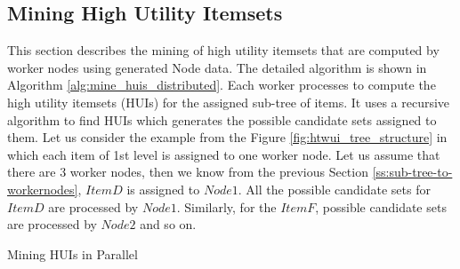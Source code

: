 \documentclass[11pt,openright]{report}
\begin{document}
\subsection{Mining High Utility Itemsets} \label{ss:minehuis}
This section describes the mining of high utility itemsets that are computed by worker nodes using generated Node data. The detailed algorithm is shown in Algorithm \ref{alg:mine_huis_distributed}. Each worker processes to compute the high utility itemsets (HUIs) for the assigned sub-tree of items. It uses a recursive algorithm to find HUIs which generates the possible candidate sets assigned to them. Let us consider the example from the Figure \ref{fig:htwui_tree_structure} in which each item of 1st level is assigned to one worker node. Let us assume that there are 3 worker nodes, then we know from the previous Section \ref{ss:sub-tree-to-workernodes}, $ItemD$ is assigned to $Node 1$. All the possible candidate sets for $ItemD$ are processed by $Node1$. Similarly, for the $ItemF$, possible candidate sets are processed by $Node2$ and so on.

{\SetAlgoNoLine
	\begin{algorithm}
		\caption{Mining HUIs in Parallel}
		\label{alg:mine_huis_distributed}
	\end{algorithm}
}

\newpage
\end{document}
